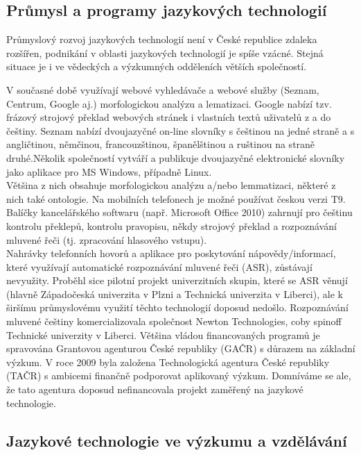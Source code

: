\begin{multicols}{2}
\subsection{Průmysl a programy jazykových technologií}

Průmyslový rozvoj jazykových technologií není v České republice zdaleka rozšířen, podnikání v oblasti jazykových technologií je spíše vzácné. Stejná situace je i ve vědeckých a výzkumných odděleních větších společností.

V současné době využívají webové vyhledávače a webové služby (Seznam, Centrum, Google aj.) morfologickou analýzu a lematizaci. Google nabízí tzv. frázový strojový překlad webových stránek i vlastních textů uživatelů z a do češtiny. Seznam nabízí dvoujazyčné on-line slovníky s češtinou na jedné straně a s angličtinou, němčinou, francouzštinou, španělštinou a ruštinou na straně druhé.Několik společností vytváří a publikuje dvoujazyčné elektronické slovníky jako aplikace pro MS Windows, případně Linux.\\
Většina z nich obsahuje morfologickou analýzu a/nebo lemmatizaci, některé z nich také ontologie. Na mobilních telefonech je možné používat českou verzi T9. Balíčky kancelářského softwaru (např. Microsoft Office 2010) zahrnují pro češtinu kontrolu překlepů, kontrolu pravopisu, někdy strojový překlad a rozpoznávání mluvené řeči (tj. zpracování hlasového vstupu).\\
Nahrávky telefonních hovorů a aplikace pro poskytování nápovědy/informací, které využívají automatické rozpoznávání mluvené řeči (ASR), zůstávají nevyužity. Proběhl sice pilotní projekt univerzitních skupin, které se ASR věnují (hlavně Západočeská univerzita v Plzni a Technická univerzita v Liberci), ale k širšímu průmyslovému využití těchto technologií doposud nedošlo.
Rozpoznávání mluvené češtiny komercializovala společnost Newton Technologies, coby spinoff Technické univerzity v Liberci. Většina vládou financovaných programů je spravována Grantovou agenturou České republiky (GAČR) s důrazem na základní výzkum. V roce 2009 byla založena Technologická agentura České republiky (TAČR) s ambicemi finančně podporovat aplikovaný výzkum. Domníváme se ale, že tato agentura doposud nefinancovala projekt zaměřený na jazykové technologie.

\subsection{Jazykové technologie ve výzkumu a vzdělávání}


\end{multicols}
